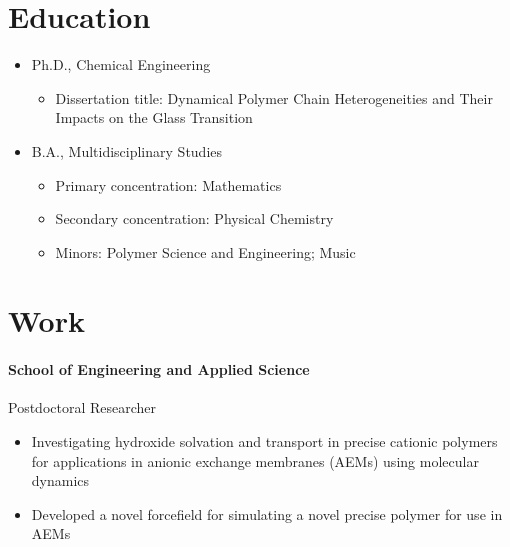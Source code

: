 \documentclass{my_cv}
\begin{document}

\section{Education}
\begin{itemize}
    \item Ph.D., Chemical Engineering
    \begin{itemize}
        \item Dissertation title: Dynamical Polymer Chain Heterogeneities and Their Impacts on the Glass Transition
    \end{itemize}
\end{itemize}
\begin{itemize}
    \item B.A., Multidisciplinary Studies
    \begin{itemize}
        \item Primary concentration: Mathematics
        \item Secondary concentration: Physical Chemistry
    \item Minors: Polymer Science and Engineering; Music
    \end{itemize}
\end{itemize}

\section{Work}
\paragraph{School of Engineering and Applied Science\\}
Post\-doctoral Researcher
\begin{itemize}
    \item Investigating hydroxide solvation and transport in precise cation\-ic polymers for applications in anionic exchange membranes (AEMs) using molecular dynamics
    \item Developed a novel force\-field for simulating a novel precise polymer for use in AEMs 
\end{itemize}

\end{document}
